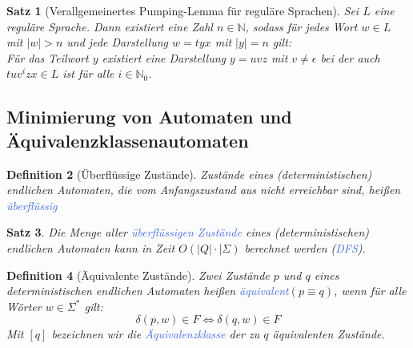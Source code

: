 \documentclass[11pt]{scrartcl}
\newcommand{\tcol}[1]{\textcolor{RoyalBlue}{#1}}
\theoremstyle{break}
\newtheorem{satz}{Satz}[section]
\newtheorem{defi}[satz]{Definition}
\begin{document}
    \begin{satz}[Verallgemeinertes Pumping-Lemma für reguläre Sprachen]
        Sei $L$ eine reguläre Sprache.
        Dann existiert eine Zahl $n\in\mathbb{N}$, sodass für jedes Wort $w\in L$ mit $|w|>n$ und jede Darstellung $w=tyx$ mit $|y|=n$ gilt:\\
        Für das Teilwort $y$ existiert eine Darstellung $y=uvz$ mit $v\neq\epsilon$ bei der auch $tuv^{i}zx\in L$ ist für alle $i\in\mathbb{N}_0$.
    \end{satz}


    \subsection{Minimierung von Automaten und Äquivalenzklassenautomaten}
	\label{subsec:minimierung-von-automatenindexund-äquivalenzklassenautomatenindex}

    \begin{defi}[Überflüssige Zustände]
        Zustände eines (deterministischen) endlichen Automaten, die vom Anfangszustand aus nicht erreichbar sind, heißen \tcol{überflüssig}
    \end{defi}

    \begin{satz}
        Die Menge aller \tcol{überflüssigen Zustände} eines (deterministischen) endlichen Automaten kann in Zeit $O(|Q|\cdot |\Sigma)$ berechnet werden (\tcol{DFS}).
    \end{satz}

    \begin{defi}[Äquivalente Zustände]
        Zwei Zustände $p$ und $q$ eines deterministischen endlichen Automaten heißen \tcol{äquivalent}$(p\equiv q)$, wenn für alle Wörter $w\in\Sigma^*$ gilt:
        \[\delta(p,w)\in F\Leftrightarrow\delta(q,w)\in F\]
        Mit $[q]$ bezeichnen wir die \tcol{Äquivalenzklasse} der zu $q$ äquivalenten Zustände.
    \end{defi}
\end{document}
